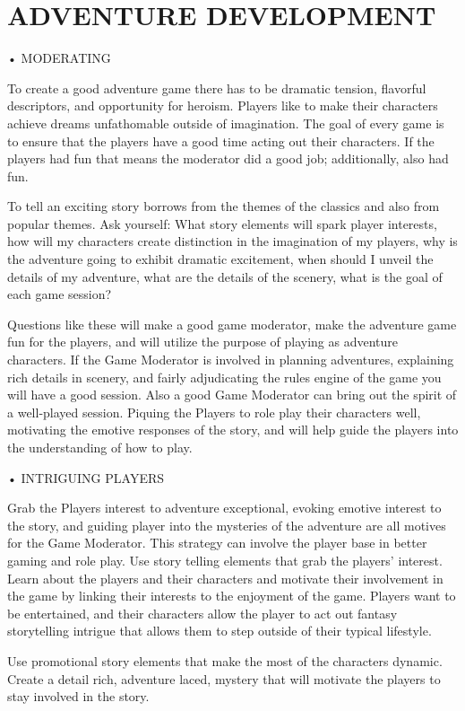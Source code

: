 \documentclass{article}
\begin{document}
\section{ADVENTURE DEVELOPMENT}

• MODERATING

	To create a good adventure game there has to be dramatic tension, flavorful descriptors, and
opportunity for heroism. Players like to make their characters achieve dreams unfathomable
outside of imagination. The goal of every game is to ensure that the players have a good time
acting out their characters. If the players had fun that means the moderator did a good job;
additionally, also had fun.

	To tell an exciting story borrows from the themes of the classics and also from popular themes.
Ask yourself: What story elements will spark player interests, how will my characters create
distinction in the imagination of my players, why is the adventure going to exhibit dramatic
excitement, when should I unveil the details of my adventure, what are the details of the
scenery, what is the goal of each game session?

	Questions like these will make a good game moderator, make the adventure game fun for the
players, and will utilize the purpose of playing as adventure characters. If the Game
Moderator is involved in planning adventures, explaining rich details in scenery, and fairly
adjudicating the rules engine of the game you will have a good session.
Also a good Game Moderator can bring out the spirit of a well-played session. Piquing the
Players to role play their characters well, motivating the emotive responses of the story, and will
help guide the players into the understanding of how to play.

• INTRIGUING PLAYERS

	Grab the Players interest to adventure exceptional, evoking emotive interest to the story, and
guiding player into the mysteries of the adventure are all motives for the Game Moderator.
This strategy can involve the player base in better gaming and role play. Use story telling
elements that grab the players’ interest. Learn about the players and their characters and motivate
their involvement in the game by linking their interests to the enjoyment of the game.
Players want to be entertained, and their characters allow the player to act out fantasy storytelling
intrigue that allows them to step outside of their typical lifestyle.

	Use promotional story elements that make the most of the characters dynamic. Create a detail
rich, adventure laced, mystery that will motivate the players to stay involved in the story.
\end{document}

